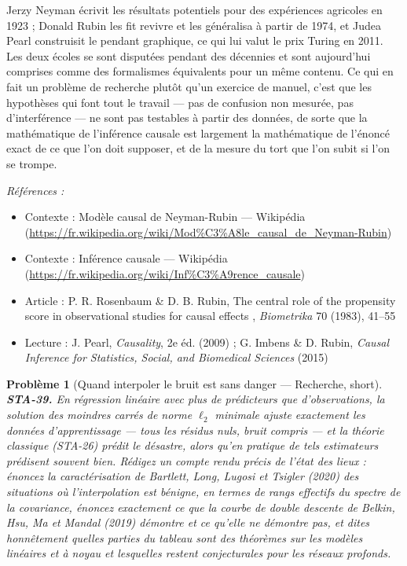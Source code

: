 \documentclass[11pt]{article}
\newtheorem{problem}{Problème}
\newenvironment{refs}{\par\small\noindent\emph{Références :}\begin{itemize}\setlength\itemsep{0pt}}{\end{itemize}\normalsize}
\begin{document}
\noindent Jerzy Neyman écrivit les résultats potentiels pour des expériences agricoles en
1923 ; Donald Rubin les fit revivre et les généralisa à partir de 1974, et Judea Pearl construisit
le pendant graphique, ce qui lui valut le prix Turing en 2011. Les deux écoles se sont disputées
pendant des décennies et sont aujourd'hui comprises comme des formalismes équivalents pour un même
contenu. Ce qui en fait un problème de recherche plutôt qu'un exercice de manuel, c'est que les
hypothèses qui font tout le travail --- pas de confusion non mesurée, pas d'interférence --- ne sont pas
testables à partir des données, de sorte que la mathématique de l'inférence causale est largement
la mathématique de l'énoncé exact de ce que l'on doit supposer, et de la mesure du tort que l'on
subit si l'on se trompe.

\begin{refs}
\item Contexte : Modèle causal de Neyman-Rubin --- Wikipédia (\url{https://fr.wikipedia.org/wiki/Mod%C3%A8le_causal_de_Neyman-Rubin})
\item Contexte : Inférence causale --- Wikipédia (\url{https://fr.wikipedia.org/wiki/Inf%C3%A9rence_causale})
\item Article : P. R. Rosenbaum \& D. B. Rubin, \og{} The central role of the propensity score in observational studies for causal effects \fg{}, \textit{Biometrika} 70 (1983), 41--55
\item Lecture : J. Pearl, \textit{Causality}, 2e éd. (2009) ; G. Imbens \& D. Rubin, \textit{Causal Inference for Statistics, Social, and Biomedical Sciences} (2015)
\end{refs}

\bigskip

\begin{problem}[{Quand interpoler le bruit est sans danger --- Recherche, short}]
\textbf{STA-39.} En régression linéaire avec plus de prédicteurs que
d'observations, la solution des moindres carrés de norme $ \ell_2 $ minimale ajuste exactement les
données d'apprentissage --- tous les résidus nuls, bruit compris --- et la théorie classique (STA-26)
prédit le désastre, alors qu'en pratique de tels estimateurs prédisent souvent bien. Rédigez un
compte rendu précis de l'état des lieux : énoncez la caractérisation de Bartlett, Long, Lugosi et
Tsigler (2020) des situations où l'interpolation est bénigne, en termes de rangs effectifs du
spectre de la covariance, énoncez exactement ce que la courbe de double descente de Belkin, Hsu, Ma
et Mandal (2019) démontre et ce qu'elle ne démontre pas, et dites honnêtement quelles parties du
tableau sont des théorèmes sur les modèles linéaires et à noyau et lesquelles restent conjecturales
pour les réseaux profonds.
\end{problem}
\end{document}
